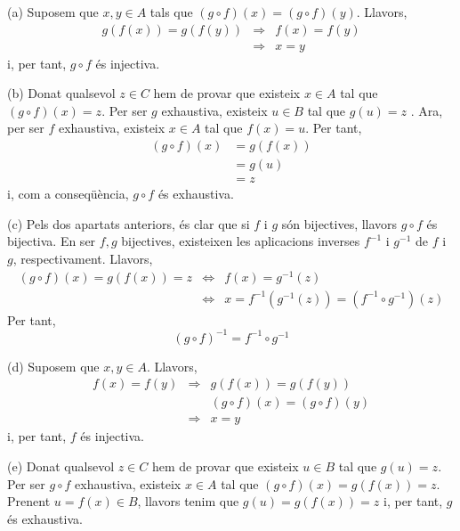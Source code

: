 \begin{solucio}
(a) Suposem que $x,y\in A$ tals que $(g\circ f)(x)=(g\circ f)(y)$. Llavors,%
\begin{equation*}
\begin{array}{lll}
g\left( f(x)\right) =g\left( f(y)\right) & \Longrightarrow & f(x)=f(y) \\
& \Longrightarrow & x=y%
\end{array}%
\end{equation*}%
i, per tant, $g\circ f$ és injectiva.

(b) Donat qualsevol $z\in C$ hem de provar que existeix $x\in A$ tal que $%
(g\circ f)(x)=z$. Per ser $g$ exhaustiva, existeix $u\in B$ tal que $g(u)=z$%
. Ara, per ser $f$ exhaustiva, existeix $x\in A$ tal que $f(x)=u$. Per tant,%
\begin{align*}
(g\circ f)(x)& =g\left( f(x)\right) \\
& =g(u) \\
& =z
\end{align*}%
i, com a conseqüència, $g\circ f$ és exhaustiva.

(c) Pels dos apartats anteriors, és clar que si $f$ i $g$ són
bijectives, llavors $g\circ f$ és bijectiva. En ser $f,g$ bijectives,
existeixen les aplicacions inverses $f^{-1}$ i $g^{-1}$ de $f$ i $g$,
respectivament. Llavors,%
\begin{equation*}
\begin{array}{lll}
(g\circ f)(x)=g\left( f(x)\right) =z & \Longleftrightarrow & f(x)=g^{-1}(z)
\\
& \Longleftrightarrow & x=f^{-1}\left( g^{-1}(z)\right) =(f^{-1}\circ
g^{-1})(z)%
\end{array}%
\end{equation*}%
Per tant,
\begin{equation*}
(g\circ f)^{-1}=f^{-1}\circ g^{-1}
\end{equation*}

(d) Suposem que $x,y\in A$. Llavors,%
\begin{equation*}
\begin{array}{lll}
f(x)=f(y) & \Longrightarrow & g\left( f(x)\right) =g\left( f(y)\right) \\
&  & (g\circ f)(x)=(g\circ f)(y) \\
& \Longrightarrow & x=y%
\end{array}%
\end{equation*}%
i, per tant, $f$ és injectiva.

(e) Donat qualsevol $z\in C$ hem de provar que existeix $u\in B$ tal que $%
g(u)=z$. Per ser $g\circ f$ exhaustiva, existeix $x\in A$ tal que $(g\circ
f)(x)=g\left( f(x)\right) =z$. Prenent $u=f(x)\in B$, llavors tenim que $%
g(u)=g\left( f(x)\right) =z$ i, per tant, $g$ és exhaustiva.


\end{solucio}
